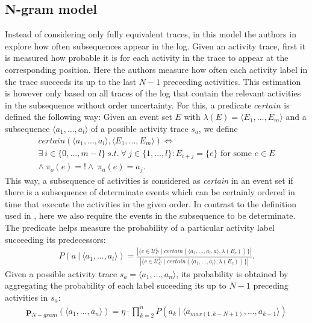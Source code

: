 \subsection{N-gram model}
Instead of considering only fully equivalent traces, in this model the authors in \cite{por} explore how often subsequences appear in the log.
Given an activity trace, first it is measured how probable it is for each activity in the trace to appear at the corresponding position.
Here the authors measure how often each activity label in the trace succeeds its up to the last $N-1$ preceeding activities.
This estimation is however only based on all traces of the log that contain the relevant activities in the subsequence without order uncertainty.
For this, a predicate $certain$ is defined the following way: 
Given an event set $E$ with $\lambda(E)=\langle E_1,...,E_m\rangle$ and a subsequence $\langle a_1,...,a_l\rangle$ of a possible activity trace $s_a$, we define
\begin{align*}
certain(\langle a_1,...,a_l \rangle, \langle E_1,...,E_m \rangle) \Leftrightarrow \\
\exists ~ i \in \{0,...,m-l\} ~ s.t.~
\forall ~ j \in \{1,...,l\}: E_{i+j} = \{e\} \text{ for some } e \in E \\ \wedge ~ \pi_o(e)=! \wedge ~ \pi_a(e)= a_j.
\end{align*}
This way, a subsequence of activities is considered as \textit{certain} in an event set if there is a subsequence of determinate events which can be certainly ordered in time that execute the activities in the given order.
In contrast to the definition used in \cite{por}, here we also require the events in the subsequence to be determinate.
The predicate helps measure the probability of a particular activity label succeeding its predecessors:
\begin{align*}
P(a ~ | ~ \langle a_1,...,a_l \rangle) = \frac{|\{c \in \mathcal{U}_C^L \mid
certain(\langle a_1,...,a_l,a \rangle, \lambda(E_c)) \}|}
{|\{c \in \mathcal{U}_C^L \mid
certain(\langle a_1,...,a_l \rangle, \lambda(E_c)) \}|}.
\end{align*}
Given a possible activity trace $s_a=\langle a_1,...,a_n\rangle$, its probability is obtained by aggregating the probability of each label suceeding its up to $N-1$ preceding activities in $s_a$:
\begin{align*}
\textbf{p}_{N-gram}(\langle a_1,...,a_n \rangle) =  \eta \cdot
\prod_{k=2}^n P(a_k ~ | ~ \langle a_{max(1,k-N+1)},..., a_{k-1}\rangle)
\end{align*}
